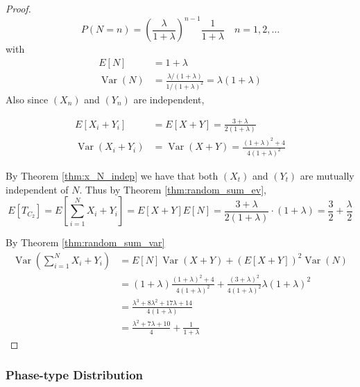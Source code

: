 \documentclass{article}
\theoremstyle{plain}
\theoremstyle{definition}
\theoremstyle{remark}
\numberwithin{equation}{section}
\newcommand{\Var}{\operatorname {Var}}
\begin{document}
\begin{proof}
$$
P(N = n) = \left(\frac{\lambda}{1 + \lambda} \right)^{n - 1} \frac{1}{1 + \lambda} \quad n = 1,2,\ldots
$$
with
\begin{align*}
    E[N] &= 1 + \lambda\\
    \Var(N) &= \frac{\lambda/(1 + \lambda)}{1/(1 + \lambda)^2} = \lambda (1 + \lambda)
\end{align*}
Also since $(X_n)$ and $(Y_n)$ are independent,

\begin{align*}
    E[X_i + Y_i] &= E[X + Y] = \frac{3 + \lambda}{2(1 + \lambda)}\\
    \Var(X_i + Y_i) &= \Var(X + Y) = \frac{(1 + \lambda)^2 + 4}{4(1 + \lambda)^2}
\end{align*}

By Theorem \ref{thm:x_N_indep} we have that both $(X_t)$ and $(Y_t)$ are mutually independent of $N$.
Thus by Theorem \eqref{thm:random_sum_ev},
$$
E[T_{C_2}] = E\left[ \sum_{i = 1}^N X_i + Y_i \right] = E[X + Y] E[N] = \frac{3 + \lambda}{2(1 + \lambda)} \cdot (1 + \lambda) = \frac{3}{2} + \frac{\lambda}{2}
$$

By Theorem \ref{thm:random_sum_var}
\begin{align*}
    \Var\left( \sum_{i = 1}^N X_i + Y_i \right) &= E[N]\Var(X + Y) + (E[X + Y])^2 \Var(N)\\
    &= (1 + \lambda) \frac{(1 + \lambda)^2 + 4}{4(1 + \lambda)^2} + \frac{(3 + \lambda)^2}{4 (1 + \lambda)^2} \lambda (1 + \lambda)^2\\
    &= \frac{\lambda^3 + 8 \lambda^2 + 17 \lambda + 14}{4(1 + \lambda)}\\
    &= \frac{\lambda^2 + 7 \lambda + 10}{4} + \frac{1}{1 + \lambda}
\end{align*}
\end{proof}

\subsubsection{Phase-type Distribution}
\end{document}
